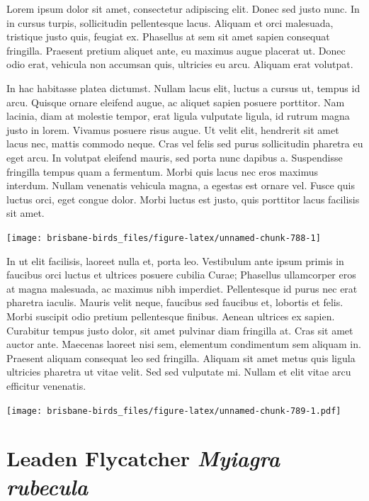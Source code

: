 \documentclass[]{book}
\let\origfigure\figure
\let\endorigfigure\endfigure
\renewenvironment{figure}[1][2] {
  \expandafter\origfigure\expandafter[H]
} {
  \endorigfigure
}
\begin{document}
Lorem ipsum dolor sit amet, consectetur adipiscing elit. Donec sed justo
nunc. In in cursus turpis, sollicitudin pellentesque lacus. Aliquam et
orci malesuada, tristique justo quis, feugiat ex. Phasellus at sem sit
amet sapien consequat fringilla. Praesent pretium aliquet ante, eu
maximus augue placerat ut. Donec odio erat, vehicula non accumsan quis,
ultricies eu arcu. Aliquam erat volutpat.

In hac habitasse platea dictumst. Nullam lacus elit, luctus a cursus ut,
tempus id arcu. Quisque ornare eleifend augue, ac aliquet sapien posuere
porttitor. Nam lacinia, diam at molestie tempor, erat ligula vulputate
ligula, id rutrum magna justo in lorem. Vivamus posuere risus augue. Ut
velit elit, hendrerit sit amet lacus nec, mattis commodo neque. Cras vel
felis sed purus sollicitudin pharetra eu eget arcu. In volutpat eleifend
mauris, sed porta nunc dapibus a. Suspendisse fringilla tempus quam a
fermentum. Morbi quis lacus nec eros maximus interdum. Nullam venenatis
vehicula magna, a egestas est ornare vel. Fusce quis luctus orci, eget
congue dolor. Morbi luctus est justo, quis porttitor lacus facilisis sit
amet.

\begin{figure}
\texttt{[image: brisbane-birds\_files/figure-latex/unnamed-chunk-788-1]} \caption{insert figure caption}\label{fig:unnamed-chunk-788}
\end{figure}

In ut elit facilisis, laoreet nulla et, porta leo. Vestibulum ante ipsum
primis in faucibus orci luctus et ultrices posuere cubilia Curae;
Phasellus ullamcorper eros at magna malesuada, ac maximus nibh
imperdiet. Pellentesque id purus nec erat pharetra iaculis. Mauris velit
neque, faucibus sed faucibus et, lobortis et felis. Morbi suscipit odio
pretium pellentesque finibus. Aenean ultrices ex sapien. Curabitur
tempus justo dolor, sit amet pulvinar diam fringilla at. Cras sit amet
auctor ante. Maecenas laoreet nisi sem, elementum condimentum sem
aliquam in. Praesent aliquam consequat leo sed fringilla. Aliquam sit
amet metus quis ligula ultricies pharetra ut vitae velit. Sed sed
vulputate mi. Nullam et elit vitae arcu efficitur venenatis.

\begin{figure}
\centering
\texttt{[image: brisbane-birds\_files/figure-latex/unnamed-chunk-789-1.pdf]}
\caption{\label{fig:unnamed-chunk-789}insert figure caption}
\end{figure}

\section{\texorpdfstring{Leaden Flycatcher \emph{Myiagra
rubecula}}{Leaden Flycatcher Myiagra rubecula}}\label{leaden-flycatcher-myiagra-rubecula}
\end{document}
